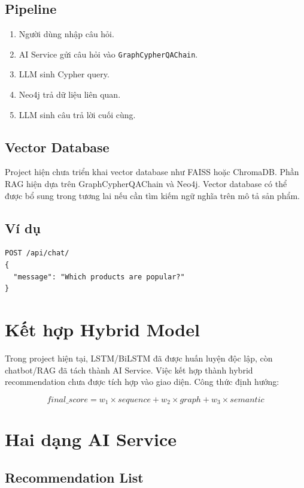 \documentclass[12pt,a4paper]{report}
\begin{document}
\subsection{Pipeline}

\begin{enumerate}
  \item Người dùng nhập câu hỏi.
  \item AI Service gửi câu hỏi vào \texttt{GraphCypherQAChain}.
  \item LLM sinh Cypher query.
  \item Neo4j trả dữ liệu liên quan.
  \item LLM sinh câu trả lời cuối cùng.
\end{enumerate}

\subsection{Vector Database}

Project hiện chưa triển khai vector database như FAISS hoặc ChromaDB. Phần RAG hiện dựa trên GraphCypherQAChain và Neo4j. Vector database có thể được bổ sung trong tương lai nếu cần tìm kiếm ngữ nghĩa trên mô tả sản phẩm.

\subsection{Ví dụ}

\begin{verbatim}
POST /api/chat/
{
  "message": "Which products are popular?"
}
\end{verbatim}

\section{Kết hợp Hybrid Model}

Trong project hiện tại, LSTM/BiLSTM đã được huấn luyện độc lập, còn chatbot/RAG đã tách thành AI Service. Việc kết hợp thành hybrid recommendation chưa được tích hợp vào giao diện. Công thức định hướng:

\[
final\_score = w_1 \times sequence + w_2 \times graph + w_3 \times semantic
\]

\section{Hai dạng AI Service}

\subsection{Recommendation List}
\end{document}
